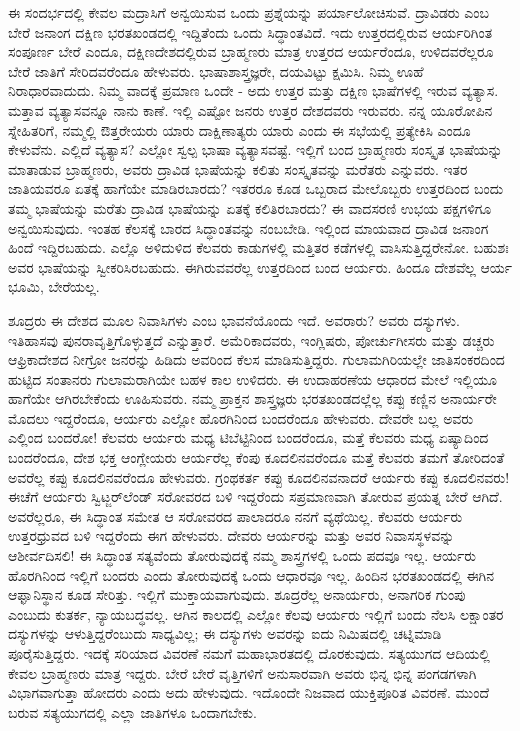 ಈ ಸಂದರ್ಭದಲ್ಲಿ ಕೇವಲ ಮದ್ರಾಸಿಗೆ ಅನ್ವಯಿಸುವ ಒಂದು ಪ್ರಶ್ನೆಯನ್ನು ಪರ್ಯಾಲೋಚಿಸುವೆ. ದ್ರಾವಿಡರು ಎಂಬ ಬೇರೆ ಜನಾಂಗ ದಕ್ಷಿಣ ಭರತಖಂಡದಲ್ಲಿ ಇದ್ದಿತೆಂದು ಒಂದು ಸಿದ್ಧಾಂತವಿದೆ. ಇದು ಉತ್ತರದಲ್ಲಿರುವ ಆರ್ಯರಿಗಿಂತ ಸಂಪೂರ್ಣ ಬೇರೆ ಎಂದೂ, ದಕ್ಷಿಣದೇಶದಲ್ಲಿರುವ ಬ್ರಾಹ್ಮಣರು ಮಾತ್ರ ಉತ್ತರದ ಆರ್ಯರೆಂದೂ, ಉಳಿದವರೆಲ್ಲರೂ ಬೇರೆ ಜಾತಿಗೆ ಸೇರಿದವರೆಂದೂ ಹೇಳುವರು. ಭಾಷಾಶಾಸ್ತ್ರಜ್ಞರೇ, ದಯವಿಟ್ಟು ಕ್ಷಮಿಸಿ. ನಿಮ್ಮ ಊಹೆ ನಿರಾಧಾರವಾದುದು. ನಿಮ್ಮ ವಾದಕ್ಕೆ ಪ್ರಮಾಣ ಒಂದೇ - ಅದು ಉತ್ತರ ಮತ್ತು ದಕ್ಷಿಣ ಭಾಷೆಗಳಲ್ಲಿ ಇರುವ ವ್ಯತ್ಯಾಸ. ಮತ್ತಾವ ವ್ಯತ್ಯಾಸವನ್ನೂ ನಾನು ಕಾಣೆ. ಇಲ್ಲಿ ಎಷ್ಟೋ ಜನರು ಉತ್ತರ ದೇಶದವರು ಇರುವರು. ನನ್ನ ಯೂರೋಪಿನ ಸ್ನೇಹಿತರಿಗೆ, ನಮ್ಮಲ್ಲಿ ಔತ್ತರೇಯರು ಯಾರು ದಾಕ್ಷಿಣಾತ್ಯರು ಯಾರು ಎಂದು ಈ ಸಭೆಯಲ್ಲಿ ಪ್ರತ್ಯೇಕಿಸಿ ಎಂದೂ ಕೇಳುವೆನು. ಎಲ್ಲಿದೆ ವ್ಯತ್ಯಾಸ? ಎಲ್ಲೋ ಸ್ವಲ್ಪ ಭಾಷಾ ವ್ಯತ್ಯಾಸವಷ್ಟೆ. ಇಲ್ಲಿಗೆ ಬಂದ ಬ್ರಾಹ್ಮಣರು ಸಂಸ್ಕೃತ ಭಾಷೆಯನ್ನು ಮಾತಾಡುವ ಬ್ರಾಹ್ಮಣರು, ಅವರು ದ್ರಾವಿಡ ಭಾಷೆಯನ್ನು ಕಲಿತು ಸಂಸ್ಕೃತವನ್ನು ಮರೆತರು ಎನ್ನುವರು. ಇತರ ಜಾತಿಯವರೂ ಏತಕ್ಕೆ ಹಾಗೆಯೇ ಮಾಡಿರಬಾರದು? ಇತರರೂ ಕೂಡ ಒಬ್ಬರಾದ ಮೇಲೊಬ್ಬರು ಉತ್ತರದಿಂದ ಬಂದು ತಮ್ಮ ಭಾಷೆಯನ್ನು ಮರೆತು ದ್ರಾವಿಡ ಭಾಷೆಯನ್ನು ಏತಕ್ಕೆ ಕಲಿತಿರಬಾರದು? ಈ ವಾದಸರಣಿ ಉಭಯ ಪಕ್ಷಗಳಿಗೂ ಅನ್ವಯಿಸುವುದು. ಇಂತಹ ಕೆಲಸಕ್ಕೆ ಬಾರದ ಸಿದ್ಧಾಂತವನ್ನು ನಂಬಬೇಡಿ. ಇಲ್ಲಿಂದ ಮಾಯವಾದ ದ್ರಾವಿಡ ಜನಾಂಗ ಹಿಂದೆ ಇದ್ದಿರಬಹುದು. ಎಲ್ಲೊ ಅಳಿದುಳಿದ ಕೆಲವರು ಕಾಡುಗಳಲ್ಲಿ ಮತ್ತಿತರ ಕಡೆಗಳಲ್ಲಿ ವಾಸಿಸುತ್ತಿದ್ದರೇನೋ. ಬಹುಶಃ ಅವರ ಭಾಷೆಯನ್ನು ಸ್ವೀಕರಿಸಿರಬಹುದು. ಈಗಿರುವವರೆಲ್ಲ ಉತ್ತರದಿಂದ ಬಂದ ಆರ್ಯರು. ಹಿಂದೂ ದೇಶವೆಲ್ಲ ಆರ್ಯ ಭೂಮಿ, ಬೇರೆಯಲ್ಲ.

ಶೂದ್ರರು ಈ ದೇಶದ ಮೂಲ ನಿವಾಸಿಗಳು ಎಂಬ ಭಾವನೆಯೊಂದು ಇದೆ. ಅವರಾರು? ಅವರು ದಸ್ಯುಗಳು. ಇತಿಹಾಸವು ಪುನರಾವೃತ್ತಿಗೊಳ್ಳುತ್ತದೆ ಎನ್ನುತ್ತಾರೆ. ಅಮೆರಿಕಾದವರು, ಇಂಗ್ಲಿಷರು, ಪೋರ್ಚುಗೀಸರು ಮತ್ತು ಡಚ್ಚರು ಆಫ್ರಿಕಾದೇಶದ ನೀಗ್ರೋ ಜನರನ್ನು ಹಿಡಿದು ಅವರಿಂದ ಕೆಲಸ ಮಾಡಿಸುತ್ತಿದ್ದರು. ಗುಲಾಮಗಿರಿಯಲ್ಲೇ ಜಾತಿಸಂಕರದಿಂದ ಹುಟ್ಟಿದ ಸಂತಾನರು ಗುಲಾಮರಾಗಿಯೇ ಬಹಳ ಕಾಲ ಉಳಿದರು. ಈ ಉದಾಹರಣೆಯ ಆಧಾರದ ಮೇಲೆ ಇಲ್ಲಿಯೂ ಹಾಗೆಯೇ ಆಗಿರಬೇಕೆಂದು ಊಹಿಸುವರು. ನಮ್ಮ ಪ್ರಾಕ್ತನ ಶಾಸ್ತ್ರಜ್ಞರು ಭರತಖಂಡದಲ್ಲೆಲ್ಲ ಕಪ್ಪು ಕಣ್ಣಿನ ಅನಾರ್ಯರೇ ಮೊದಲು ಇದ್ದರೆಂದೂ, ಆರ್ಯರು ಎಲ್ಲೋ ಹೊರಗಿನಿಂದ ಬಂದರೆಂದೂ ಹೇಳುವರು. ದೇವರೇ ಬಲ್ಲ ಅವರು ಎಲ್ಲಿಂದ ಬಂದರೋ! ಕೆಲವರು ಆರ್ಯರು ಮಧ್ಯ ಟಿಬೆಟ್ಟಿನಿಂದ ಬಂದರೆಂದೂ, ಮತ್ತೆ ಕೆಲವರು ಮಧ್ಯ ಏಷ್ಯಾದಿಂದ ಬಂದರೆಂದೂ, ದೇಶ ಭಕ್ತ ಆಂಗ್ಲೇಯರು ಆರ್ಯರೆಲ್ಲ ಕೆಂಪು ಕೂದಲಿನವರೆಂದೂ ಮತ್ತೆ ಕೆಲವರು ತಮಗೆ ತೋರಿದಂತೆ ಅವರೆಲ್ಲ ಕಪ್ಪು ಕೂದಲಿನವರೆಂದೂ ಹೇಳುವರು. ಗ್ರಂಥಕರ್ತ ಕಪ್ಪು ಕೂದಲಿನವನಾದರೆ ಆರ್ಯರು ಕಪ್ಪು ಕೂದಲಿನವರು! ಈಚೆಗೆ ಆರ್ಯರು ಸ್ವಿಟ್ಜರ್​ಲೆಂಡ್​ ಸರೋವರದ ಬಳಿ ಇದ್ದರೆಂದು ಸಪ್ರಮಾಣವಾಗಿ ತೋರುವ ಪ್ರಯತ್ನ ಬೇರೆ ಆಗಿದೆ. ಅವರೆಲ್ಲರೂ, ಈ ಸಿದ್ಧಾಂತ ಸಮೇತ ಆ ಸರೋವರದ ಪಾಲಾದರೂ ನನಗೆ ವ್ಯಥೆಯಿಲ್ಲ. ಕೆಲವರು ಆರ್ಯರು ಉತ್ತರಧ್ರುವದ ಬಳಿ ಇದ್ದರೆಂದು ಈಗ ಹೇಳುವರು. ದೇವರು ಆರ್ಯರನ್ನು ಮತ್ತು ಅವರ ನಿವಾಸಸ್ಥಳವನ್ನು ಆಶೀರ್ವದಿಸಲಿ! ಈ ಸಿದ್ಧಾಂತ ಸತ್ಯವೆಂದು ತೋರುವುದಕ್ಕೆ ನಮ್ಮ ಶಾಸ್ತ್ರಗಳಲ್ಲಿ ಒಂದು ಪದವೂ ಇಲ್ಲ. ಆರ್ಯರು ಹೊರಗಿನಿಂದ ಇಲ್ಲಿಗೆ ಬಂದರು ಎಂದು ತೋರುವುದಕ್ಕೆ ಒಂದು ಆಧಾರವೂ ಇಲ್ಲ. ಹಿಂದಿನ ಭರತಖಂಡದಲ್ಲಿ ಈಗಿನ ಆಫ್ಘಾನಿಸ್ಥಾನ ಕೂಡ ಸೇರಿತ್ತು. ಇಲ್ಲಿಗೆ ಮುಕ್ತಾಯವಾಗುವುದು. ಶೂದ್ರರೆಲ್ಲ ಅನಾರ್ಯರು, ಅನಾಗರಿಕ ಗುಂಪು ಎಂಬುದು ಕುತರ್ಕ, ನ್ಯಾಯಬದ್ಧವಲ್ಲ. ಆಗಿನ ಕಾಲದಲ್ಲಿ ಎಲ್ಲೋ ಕೆಲವು ಆರ್ಯರು ಇಲ್ಲಿಗೆ ಬಂದು ನೆಲಸಿ ಲಕ್ಷಾಂತರ ದಸ್ಯುಗಳನ್ನು ಆಳುತ್ತಿದ್ದರೆಂಬುದು ಸಾಧ್ಯವಿಲ್ಲ; ಈ ದಸ್ಯುಗಳು ಅವರನ್ನು ಐದು ನಿಮಿಷದಲ್ಲಿ ಚಟ್ನಿಮಾಡಿ ಪೂರೈಸುತ್ತಿದ್ದರು. ಇದಕ್ಕೆ ಸರಿಯಾದ ವಿವರಣೆ ನಮಗೆ ಮಹಾಭಾರತದಲ್ಲಿ ದೊರಕುವುದು. ಸತ್ಯಯುಗದ ಆದಿಯಲ್ಲಿ ಕೇವಲ ಬ್ರಾಹ್ಮಣರು ಮಾತ್ರ ಇದ್ದರು. ಬೇರೆ ಬೇರೆ ವೃತ್ತಿಗಳಿಗೆ ಅನುಸಾರವಾಗಿ ಅವರು ಭಿನ್ನ ಭಿನ್ನ ಪಂಗಡಗಳಾಗಿ ವಿಭಾಗವಾಗುತ್ತಾ ಹೋದರು ಎಂದು ಅದು ಹೇಳುವುದು. ಇದೊಂದೇ ನಿಜವಾದ ಯುಕ್ತಿಪೂರಿತ ವಿವರಣೆ. ಮುಂದೆ ಬರುವ ಸತ್ಯಯುಗದಲ್ಲಿ ಎಲ್ಲಾ ಜಾತಿಗಳೂ ಒಂದಾಗಬೇಕು.

